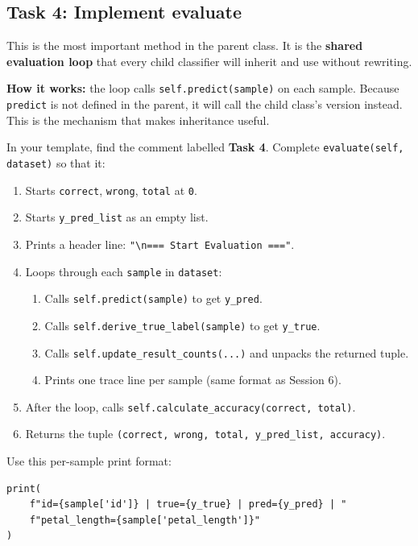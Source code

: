 \subsection{Task 4: Implement evaluate}

\begin{tcolorbox}[title=Task 4: Implement evaluate]
This is the most important method in the parent class.
It is the \textbf{shared evaluation loop} that every child classifier will inherit and use without rewriting.

\medskip
\noindent
\textbf{How it works:} the loop calls \texttt{self.predict(sample)} on each sample.
Because \texttt{predict} is not defined in the parent, it will call the child class's version instead.
This is the mechanism that makes inheritance useful.

\medskip
\noindent
In your template, find the comment labelled \textbf{Task 4}.
Complete \texttt{evaluate(self, dataset)} so that it:
\begin{enumerate}
    \item Starts \texttt{correct}, \texttt{wrong}, \texttt{total} at \texttt{0}.
    \item Starts \texttt{y\_pred\_list} as an empty list.
    \item Prints a header line: \texttt{"\textbackslash n=== Start Evaluation ==="}.
    \item Loops through each \texttt{sample} in \texttt{dataset}:
    \begin{enumerate}
        \item Calls \texttt{self.predict(sample)} to get \texttt{y\_pred}.
        \item Calls \texttt{self.derive\_true\_label(sample)} to get \texttt{y\_true}.
        \item Calls \texttt{self.update\_result\_counts(...)} and unpacks the returned tuple.
        \item Prints one trace line per sample (same format as Session 6).
    \end{enumerate}
    \item After the loop, calls \texttt{self.calculate\_accuracy(correct, total)}.
    \item Returns the tuple \texttt{(correct, wrong, total, y\_pred\_list, accuracy)}.
\end{enumerate}

\medskip
\noindent
Use this per-sample print format:
\begin{verbatim}
print(
    f"id={sample['id']} | true={y_true} | pred={y_pred} | "
    f"petal_length={sample['petal_length']}"
)
\end{verbatim}
\end{tcolorbox}

